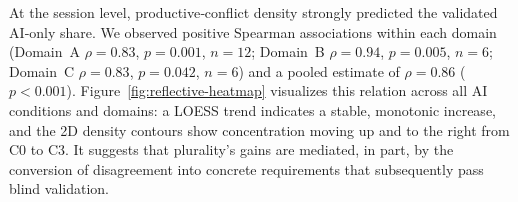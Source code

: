 \documentclass[acmsmall]{acmart}
\begin{document}
\begin{table}[h]
  \centering
  \caption{Conflict dynamics by condition. Domain~A values are mean$\pm$SD across three seeds. Satellites pool Domains~B and~C and report mean$\pm$SD across both domains and their two seeds each.}
  \label{tab:conflict}
  \small
  \setlength{\tabcolsep}{5pt}
\end{table}

At the session level, productive‑conflict density strongly predicted the validated AI‑only share. We observed positive Spearman associations within each domain (Domain~A \(\rho{=}0.83\), \(p{=}0.001\), \(n{=}12\); Domain~B \(\rho{=}0.94\), \(p{=}0.005\), \(n{=}6\); Domain~C \(\rho{=}0.83\), \(p{=}0.042\), \(n{=}6\)) and a pooled estimate of \(\rho{=}0.86\) (\(p{<}0.001\)). Figure~\ref{fig:reflective-heatmap} visualizes this relation across all AI conditions and domains: a LOESS trend indicates a stable, monotonic increase, and the 2D density contours show concentration moving up and to the right from C0 to C3. It suggests that plurality’s gains are mediated, in part, by the conversion of disagreement into concrete requirements that subsequently pass blind validation. 
\end{document}
